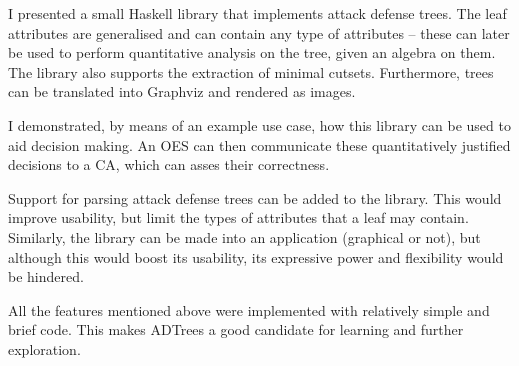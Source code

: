 \documentclass{scrreprt}
\begin{document}
I presented a small Haskell library that implements attack defense trees. The
leaf attributes are generalised and can contain any type of attributes -- these
can later be used to perform quantitative analysis on the tree, given an algebra
on them.  The library also supports the extraction of minimal cutsets.
Furthermore, trees can be translated into Graphviz and rendered as images.

I demonstrated, by means of an example use case, how this library can be used to
aid decision making. An OES can then communicate these quantitatively justified
decisions to a CA, which can asses their correctness.

Support for parsing attack defense trees can be added to the library. This would
improve usability, but limit the types of attributes that a leaf may contain.
Similarly, the library can be made into an application (graphical or not), but
although this would boost its usability, its expressive power and flexibility
would be hindered. 

All the features mentioned above were implemented with relatively simple and
brief code. This makes ADTrees a good candidate for learning and further
exploration.



\end{document}
